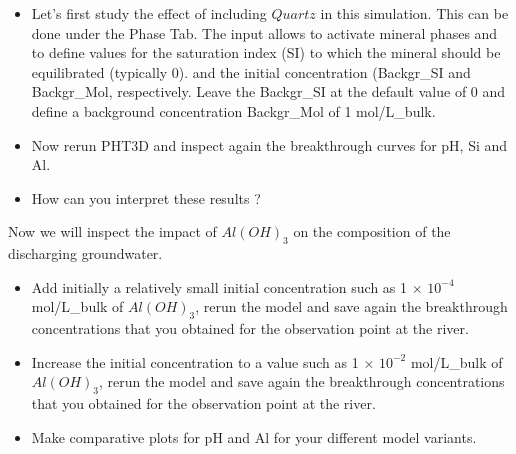 \begin{itemize}

\item Let's first study the effect of including $Quartz$ in this simulation. 
This can be done under the {\color{blue}Phase} Tab. The input allows to activate mineral phases 
and to define values for the saturation index (SI) to which the mineral should be equilibrated (typically 0).
and the initial concentration (Backgr\_SI and Backgr\_Mol, respectively.
Leave the Backgr\_SI at the default value of 0 and define a background concentration Backgr\_Mol of 1 mol/L\_bulk. 

\item Now rerun PHT3D and inspect again the breakthrough curves for pH, Si and Al.

\item How can you interpret these results ?  

\end{itemize}

Now we will inspect the impact of $Al(OH)_3$ on the composition of the discharging groundwater.

\begin{itemize}

\item Add initially a relatively small initial concentration such as 1 $\times$ $10^{-4}$ mol/L\_bulk 
of $Al(OH)_3$, rerun the model and save again the breakthrough concentrations that you obtained for the observation point at the river.

\item Increase the initial concentration to a value such as 1 $\times$ $10^{-2}$ mol/L\_bulk 
of $Al(OH)_3$, rerun the model and save again the breakthrough concentrations that you obtained for the observation point at the river.

\item Make comparative plots for pH and Al for your different model variants. 

\end{itemize}






